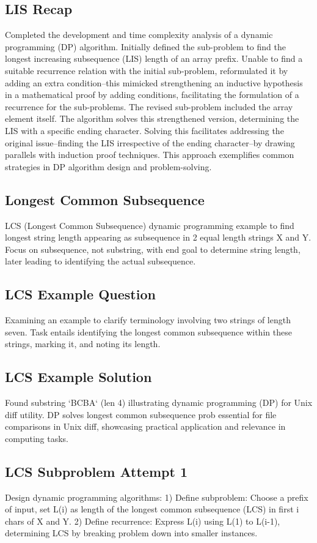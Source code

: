 \subsection*{LIS Recap}
Completed the development and time complexity analysis of a dynamic programming (DP) algorithm.
Initially defined the sub-problem to find the longest increasing subsequence (LIS) length of an array prefix.
Unable to find a suitable recurrence relation with the initial sub-problem, reformulated it by adding an extra condition--this mimicked strengthening an inductive hypothesis in a mathematical proof by adding conditions, facilitating the formulation of a recurrence for the sub-problems.
The revised sub-problem included the array element itself.
The algorithm solves this strengthened version, determining the LIS with a specific ending character.
Solving this facilitates addressing the original issue--finding the LIS irrespective of the ending character--by drawing parallels with induction proof techniques.
This approach exemplifies common strategies in DP algorithm design and problem-solving.

\subsection*{Longest Common Subsequence}
LCS (Longest Common Subsequence) dynamic programming example to find longest string length appearing as subsequence in 2 equal length strings X and Y\@.
Focus on subsequence, not substring, with end goal to determine string length, later leading to identifying the actual subsequence.

\subsection*{LCS Example Question}
Examining an example to clarify terminology involving two strings of length seven.
Task entails identifying the longest common subsequence within these strings, marking it, and noting its length.

\subsection*{LCS Example Solution}
Found substring `BCBA` (len 4) illustrating dynamic programming (DP) for Unix diff utility.
DP solves longest common subsequence prob essential for file comparisons in Unix diff, showcasing practical application and relevance in computing tasks.

\subsection*{LCS  Subproblem Attempt 1}
Design dynamic programming algorithms: 1) Define subproblem: Choose a prefix of input, set L(i) as length of the longest common subsequence (LCS) in first i chars of X and Y\@.
2) Define recurrence: Express L(i) using L(1) to L(i-1), determining LCS by breaking problem down into smaller instances.

